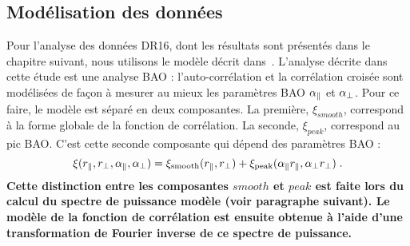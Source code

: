 \documentclass[11pt, twoside, a4paper, openright]{report}
\begin{document}
\subsection{Modélisation des données}
\label{subsec:model_donnees}
Pour l'analyse des données DR16, dont les résultats sont présentés dans le chapitre suivant, nous utilisons le modèle décrit dans~\textcite{prov}. L'analyse décrite dans cette étude est une analyse BAO : l'auto-corrélation et la corrélation croisée sont modélisées de façon à mesurer au mieux les paramètres BAO $\alpha_{\parallel}{}$ et $\alpha_{\perp}{}$.
Pour ce faire, le modèle est séparé en deux composantes. La première, $\xi_{smooth}$, correspond à la forme globale de la fonction de corrélation. 
La seconde, $\xi_{peak}$, correspond au pic BAO. C'est cette seconde composante qui dépend des paramètres BAO :
\begin{equation}
  \xi(r_{\parallel}{}, r_{\perp}{}, \alpha_{\parallel}{}, \alpha_{\perp}{}) = \xi_{\mathrm{smooth}}(r_{\parallel}{}, r_{\perp}{}) + \xi_{\mathrm{peak}}(\alpha_{\parallel}{} r_{\parallel}{}, \alpha_{\perp}{} r_{\perp}{}) \; .
\end{equation}
\textbf{Cette distinction entre les composantes $smooth$ et $peak$ est faite lors du calcul du spectre de puissance modèle (voir paragraphe suivant). Le modèle de la fonction de corrélation est ensuite obtenue à l'aide d'une transformation de Fourier inverse de ce spectre de puissance.}
\end{document}
